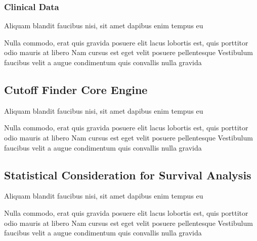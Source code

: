 \documentclass[
paper=landscape,
paper=160mm:90mm, %
fontsize=11pt, %
pagesize, %
parskip=half-, %
]{scrartcl} %
\theoremstyle{mythmstyle} %
\begin{document}
\clearpage

\subsubsection{Clinical Data} 

\begin{outline}

\1 Aliquam blandit faucibus nisi, sit amet dapibus enim tempus eu

\2 Nulla commodo, erat quis gravida posuere
\1 elit lacus lobortis est, quis porttitor odio mauris at libero
\1 Nam cursus est eget velit posuere pellentesque
\1 Vestibulum faucibus velit a augue condimentum quis convallis nulla gravida

\end{outline}


\clearpage

\subsection{Cutoff Finder Core Engine}

\begin{outline}

\1 Aliquam blandit faucibus nisi, sit amet dapibus enim tempus eu

\2 Nulla commodo, erat quis gravida posuere
\1 elit lacus lobortis est, quis porttitor odio mauris at libero
\1 Nam cursus est eget velit posuere pellentesque
\1 Vestibulum faucibus velit a augue condimentum quis convallis nulla gravida

\end{outline}


\clearpage

\subsection{Statistical Consideration for Survival Analysis}

\begin{outline}

\1 Aliquam blandit faucibus nisi, sit amet dapibus enim tempus eu

\2 Nulla commodo, erat quis gravida posuere
\1 elit lacus lobortis est, quis porttitor odio mauris at libero
\1 Nam cursus est eget velit posuere pellentesque
\1 Vestibulum faucibus velit a augue condimentum quis convallis nulla gravida

\end{outline}
\end{document}
